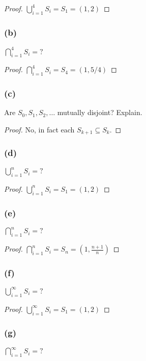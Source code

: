 \documentclass[14pt]{extarticle}
\newcommand{\dps}{\displaystyle}
\begin{document}
\begin{proof}
  \(\dps \bigcup_{i=1}^{4}S_i = S_1 = (1, 2)\)
\end{proof}

\subsubsection{(b)}
\(\dps \bigcap_{i=1}^{4}S_i = ?\)

\begin{proof}
  \(\dps \bigcap_{i=1}^{4}S_i = S_4 = (1, 5/4)\)
\end{proof}

\subsubsection{(c)}
Are \(S_0, S_1, S_2, \ldots\) mutually disjoint? Explain.

\begin{proof}
  No, in fact each \(S_{k+1} \subseteq S_k\).
\end{proof}

\subsubsection{(d)}
\(\dps \bigcup_{i=1}^{n}S_i = ?\)

\begin{proof}
  \(\dps \bigcup_{i=1}^{n}S_i = S_1 = (1, 2)\)
\end{proof}

\subsubsection{(e)}
\(\dps \bigcap_{i=1}^{n}S_i = ?\)

\begin{proof}
  \(\dps \bigcap_{i=1}^{n}S_i = S_n = (1, \frac{n+1}{n})\)
\end{proof}

\subsubsection{(f)}
\(\dps \bigcup_{i=1}^{\infty}S_i = ?\)

\begin{proof}
  \(\dps \bigcup_{i=1}^{\infty}S_i = S_1 = (1, 2)\)
\end{proof}

\subsubsection{(g)}
\(\dps \bigcap_{i=1}^{\infty}S_i = ?\)
\end{document}
